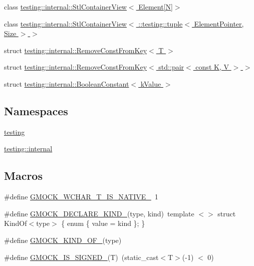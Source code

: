 \begin{DoxyCompactItemize}
class \hyperlink{classtesting_1_1internal_1_1StlContainerView_3_01Element[N]_4}{testing\+::internal\+::\+Stl\+Container\+View$<$ Element\mbox{[}\+N\mbox{]}$>$}
\item 
class \hyperlink{classtesting_1_1internal_1_1StlContainerView_3_01_1_1testing_1_1tuple_3_01ElementPointer_00_01Size_01_4_01_4}{testing\+::internal\+::\+Stl\+Container\+View$<$ \+::testing\+::tuple$<$ Element\+Pointer, Size $>$ $>$}
\item 
struct \hyperlink{structtesting_1_1internal_1_1RemoveConstFromKey}{testing\+::internal\+::\+Remove\+Const\+From\+Key$<$ T $>$}
\item 
struct \hyperlink{structtesting_1_1internal_1_1RemoveConstFromKey_3_01std_1_1pair_3_01const_01K_00_01V_01_4_01_4}{testing\+::internal\+::\+Remove\+Const\+From\+Key$<$ std\+::pair$<$ const K, V $>$ $>$}
\item 
struct \hyperlink{structtesting_1_1internal_1_1BooleanConstant}{testing\+::internal\+::\+Boolean\+Constant$<$ k\+Value $>$}
\end{DoxyCompactItemize}
\subsection*{Namespaces}
\begin{DoxyCompactItemize}
\item 
 \hyperlink{namespacetesting}{testing}
\item 
 \hyperlink{namespacetesting_1_1internal}{testing\+::internal}
\end{DoxyCompactItemize}
\subsection*{Macros}
\begin{DoxyCompactItemize}
\item 
\#define \hyperlink{gmock-internal-utils_8h_a0725bd2b3326d282677e5197e53cc5e9}{G\+M\+O\+C\+K\+\_\+\+W\+C\+H\+A\+R\+\_\+\+T\+\_\+\+I\+S\+\_\+\+N\+A\+T\+I\+V\+E\+\_\+}~1
\item 
\#define \hyperlink{gmock-internal-utils_8h_a7d8a1871d7a30543a4e1882a8b2bbcd8}{G\+M\+O\+C\+K\+\_\+\+D\+E\+C\+L\+A\+R\+E\+\_\+\+K\+I\+N\+D\+\_\+}(type,  kind)~template $<$$>$ struct Kind\+Of$<$type$>$ \{ enum \{ value = kind \}; \}
\item 
\#define \hyperlink{gmock-internal-utils_8h_a72b01bdd08b78e927270885ca880ead4}{G\+M\+O\+C\+K\+\_\+\+K\+I\+N\+D\+\_\+\+O\+F\+\_\+}(type)
\item 
\#define \hyperlink{gmock-internal-utils_8h_a8ee49a1af821b48fd83849c050d0d5a2}{G\+M\+O\+C\+K\+\_\+\+I\+S\+\_\+\+S\+I\+G\+N\+E\+D\+\_\+}(T)~(static\+\_\+cast$<$T$>$(-\/1) $<$ 0)
\end{DoxyCompactItemize}
